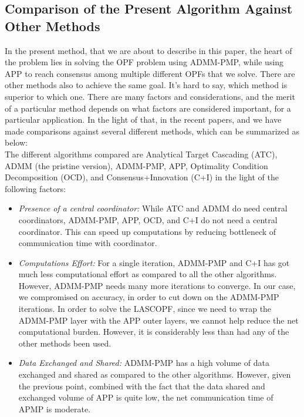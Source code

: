 \documentclass[preprint,12pt,3p]{elsarticle}
\begin{document}
	\subsection{Comparison of the Present Algorithm Against Other Methods}In the present method, that we are about to describe in this paper, the heart of the problem lies in solving the OPF problem using ADMM-PMP, while using APP to reach consensus among multiple different OPFs that we solve. There are other methods also to achieve the same goal. It's hard to say, which method is superior to which one. There are many factors and considerations, and the merit of a particular method depends on what factors are considered important, for a particular application. In the light of that, in the recent papers, \cite{SurvKarg} and \cite{SurvMol} we have made comparisons against several different methods, which can be summarized as below:\\
	The different algorithms compared are Analytical Target Cascading (ATC), ADMM (the pristine version), ADMM-PMP, APP, Optimality Condition Decomposition (OCD), and Consensus+Innovation (C+I) in the light of the following factors:\\
	\begin{itemize}
		\item \textit{Presence of a central coordinator:} While ATC and ADMM do need central coordinators, ADMM-PMP, APP, OCD, and C+I do not need a central coordinator. This can speed up computations by reducing bottleneck of communication time with coordinator.
		\item \textit{Computations Effort:} For a single iteration, ADMM-PMP and C+I has got much less computational effort as compared to all the other algorithms. However, ADMM-PMP needs many more iterations to converge. In our case, we compromised on accuracy, in order to cut down on the ADMM-PMP iterations. In order to solve the LASCOPF, since we need to wrap the ADMM-PMP layer with the APP outer layers, we cannot help reduce the net computational burden. However, it is considerably less than had any of the other methods been used. 
		\item \textit{Data Exchanged and Shared: }ADMM-PMP has a high volume of data exchanged and shared as compared to the other algorithms. However, given the previous point, combined with the fact that the data shared and exchanged volume of APP is quite low, the net communication time of APMP is moderate.
	\end{itemize}
\end{document}
